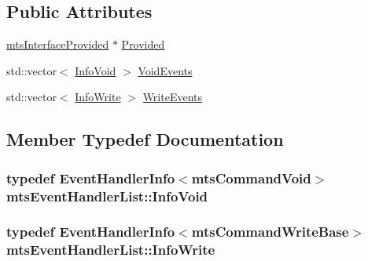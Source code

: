 \subsection*{Public Attributes}
\begin{DoxyCompactItemize}
\item 
\hyperlink{classmts_interface_provided}{mts\+Interface\+Provided} $\ast$ \hyperlink{classmts_event_handler_list_a9e99be005cdcdb3ecfbb5bc2f3d79edb}{Provided}
\item 
std\+::vector$<$ \hyperlink{classmts_event_handler_list_a7b977bcaba00a2616c48b250d02d53d5}{Info\+Void} $>$ \hyperlink{classmts_event_handler_list_a8ef4db8408648d0cb17035158a483ad9}{Void\+Events}
\item 
std\+::vector$<$ \hyperlink{classmts_event_handler_list_ac4f93c3df99ddcff2ecc44e52f76ffc8}{Info\+Write} $>$ \hyperlink{classmts_event_handler_list_a81ec4eb1a15604dc9e2b0b88ff7c21a0}{Write\+Events}
\end{DoxyCompactItemize}


\subsection{Member Typedef Documentation}
\hypertarget{classmts_event_handler_list_a7b977bcaba00a2616c48b250d02d53d5}{}
\subsubsection[{Info\+Void}]{\setlength{\rightskip}{0pt plus 5cm}typedef Event\+Handler\+Info$<${\bf mts\+Command\+Void}$>$ {\bf mts\+Event\+Handler\+List\+::\+Info\+Void}}\label{classmts_event_handler_list_a7b977bcaba00a2616c48b250d02d53d5}
\hypertarget{classmts_event_handler_list_ac4f93c3df99ddcff2ecc44e52f76ffc8}{}
\subsubsection[{Info\+Write}]{\setlength{\rightskip}{0pt plus 5cm}typedef Event\+Handler\+Info$<${\bf mts\+Command\+Write\+Base}$>$ {\bf mts\+Event\+Handler\+List\+::\+Info\+Write}}\label{classmts_event_handler_list_ac4f93c3df99ddcff2ecc44e52f76ffc8}


